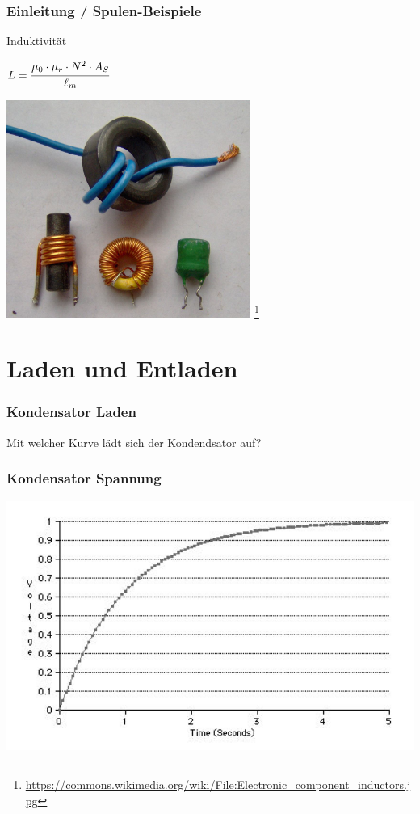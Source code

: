 \begin{frame}
  \frametitle{Einleitung / Spulen-Beispiele}
  \begin{block}{Induktivität}
    \begin{center}
      \Large{$L = \cfrac{\mu_0 \cdot \mu_r \cdot N^2 \cdot A_S}{\ell_m}$}
    \end{center}
  \end{block}
  \begin{center}
    \includegraphics[width=0.6\textwidth,height=0.5\textheight,keepaspectratio]{a03/Spule.jpg}
    \footnote{\tiny \url{https://commons.wikimedia.org/wiki/File:Electronic_component_inductors.jpg}}
  \end{center}
\end{frame}


\section*{Laden und Entladen}

\begin{frame}
  \frametitle{Kondensator Laden}
  \begin{center}
    \Large{Mit welcher Kurve lädt sich der Kondendsator auf?}\\
  \end{center}
\end{frame}

\begin{frame}
  \frametitle{Kondensator Spannung}
  \begin{center}
    \includegraphics[width=1\textwidth,height=.85\textheight,keepaspectratio]{a03/Capacitor_Charge_Graph.jpg}
    \tiny \hyperlink{refs}{\cite{wc}}
  \end{center}
\end{frame}

